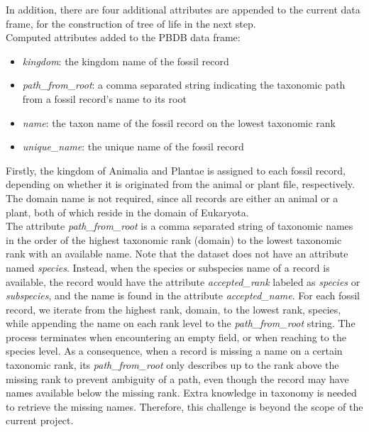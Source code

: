 \documentclass[11pt, a4paper,oneside,chapterprefix=false]{scrbook}
\begin{document}
In addition, there are four additional attributes are appended to the current data frame, for the construction of tree of life in the next step. \\

\noindent Computed attributes added to the PBDB data frame:
\begin{itemize}
	\item \textit{kingdom}: the kingdom name of the fossil record
	\item \textit{path\_from\_root}: a comma separated string indicating the taxonomic path from a fossil record's name to its root
	\item \textit{name}: the taxon name of the fossil record on the lowest taxonomic rank
	\item \textit{unique\_name}: the unique name of the fossil record

\end{itemize}


Firstly, the kingdom of Animalia and Plantae is assigned to each fossil record, depending on whether it is originated from the animal or plant file, respectively. The domain name is not required, since all records are either an animal or a plant, both of which reside in the domain of Eukaryota. \\

The attribute \emph{path\_from\_root} is a comma separated string of taxonomic names in the order of the highest taxonomic rank (domain) to the lowest taxonomic rank with an available name. Note that the dataset does not have an attribute named \emph{species}. Instead, when the species or subspecies name of a record is available, the record would have the attribute \emph{accepted\_rank} labeled as \emph{species} or \emph{subspecies}, and the name is found in the attribute \emph{accepted\_name}. For each fossil record, we iterate from the highest rank, domain, to the lowest rank, species, while appending the name on each rank level to the \emph{path\_from\_root} string. The process terminates when encountering an empty field, or when reaching to the species level. As a consequence, when a record is missing a name on a certain taxonomic rank, its \emph{path\_from\_root} only describes up to the rank above the missing rank to prevent ambiguity of a path, even though the record may have names available below the missing rank. Extra knowledge in taxonomy is needed to retrieve the missing names. Therefore, this challenge is beyond the scope of the current project. \\
\end{document}

